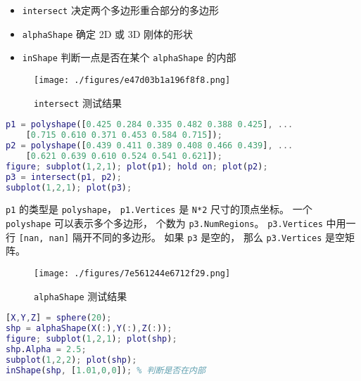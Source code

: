 
\begin{issues}
\issueDraft
\end{issues}

\begin{itemize}
\item \verb`intersect` 决定两个多边形重合部分的多边形
\item \verb`alphaShape` 确定 2D 或 3D 刚体的形状
\item \verb`inShape` 判断一点是否在某个 \verb`alphaShape` 的内部
\end{itemize}

\begin{figure}[ht]
\centering
\texttt{[image: ./figures/e47d03b1a196f8f8.png]}
\caption{\lstinline|intersect| 测试结果} \label{fig_RigBMa_1}
\end{figure}

\begin{lstlisting}[language=matlab]
p1 = polyshape([0.425 0.284 0.335 0.482 0.388 0.425], ...
    [0.715 0.610 0.371 0.453 0.584 0.715]);
p2 = polyshape([0.439 0.411 0.389 0.408 0.466 0.439], ...
    [0.621 0.639 0.610 0.524 0.541 0.621]);
figure; subplot(1,2,1); plot(p1); hold on; plot(p2);
p3 = intersect(p1, p2);
subplot(1,2,1); plot(p3);
\end{lstlisting}
\verb`p1` 的类型是 \verb`polyshape`， \verb`p1.Vertices` 是 \verb`N*2` 尺寸的顶点坐标。 一个 \verb`polyshape` 可以表示多个多边形， 个数为 \verb`p3.NumRegions`。 \verb`p3.Vertices` 中用一行 \verb`[nan, nan]` 隔开不同的多边形。 如果 \verb`p3` 是空的， 那么 \verb`p3.Vertices` 是空矩阵。


\begin{figure}[ht]
\centering
\texttt{[image: ./figures/7e561244e6712f29.png]}
\caption{\lstinline|alphaShape| 测试结果} \label{fig_RigBMa_2}
\end{figure}

\begin{lstlisting}[language=matlab]
[X,Y,Z] = sphere(20);
shp = alphaShape(X(:),Y(:),Z(:));
figure; subplot(1,2,1); plot(shp);
shp.Alpha = 2.5;
subplot(1,2,2); plot(shp);
inShape(shp, [1.01,0,0]); % 判断是否在内部
\end{lstlisting}
